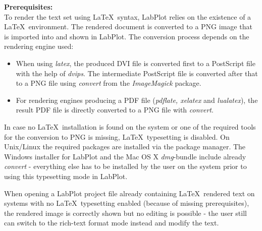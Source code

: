 \textbf{Prerequisites:}\\
To render the text set using \LaTeX\, syntax, LabPlot relies on the existence of a \LaTeX\, environment. The rendered document is converted to a PNG image that is imported into and shown in LabPlot. The conversion process depends on the rendering engine used:
\begin{itemize}
\item When using \textit{latex}, the produced DVI file is converted first to a PostScript file with the help of \textit{dvips}. The intermediate PostScript file is converted after that to a PNG file using \textit{convert} from the \textit{ImageMagick} package.
\item For rendering engines producing a PDF file (\textit{pdflate, xelatex} and \textit{lualatex}), the result PDF file is directly converted to a PNG file with \textit{convert}.
\end{itemize}

In case no \LaTeX\, installation is found on the system or one of the required tools for the conversion to PNG is missing, \LaTeX\, typesetting is disabled. On Unix/Linux the required packages are installed via the package manager. The Windows installer for LabPlot and the Mac OS X \textit{dmg}-bundle include already \textit{convert} - everything else has to be installed by the user on the system prior to using this typesetting mode in LabPlot.

When opening a LabPlot project file already containing \LaTeX\, rendered text on systems with no \LaTeX\, typesetting enabled (because of missing prerequisites), the rendered image is  correctly shown but no editing is possible - the user still can switch to the rich-text format mode instead and modify the text.


